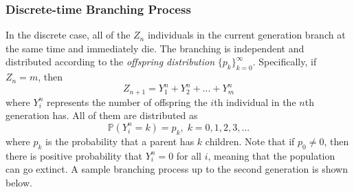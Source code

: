   \subsubsection{Discrete-time Branching Process}

    In the discrete case, all of the $Z_n$ individuals in the current generation branch at the same time and immediately die. The branching is independent and distributed according to the \textit{offspring distribution} $\{p_k\}_{k=0}^\infty$. Specifically, if $Z_n = m$, then 
    \begin{equation}
      Z_{n+1} = Y_1^n + Y_2^n + ... + Y_m^n
    \end{equation}
    where $Y_i^n$ represents the number of offspring the $i$th individual in the $n$th generation has. All of them are distributed as
    \begin{equation}
      \mathbb{P}(Y_i^n = k) = p_k, \; k = 0, 1, 2, 3, ...
    \end{equation}
    where $p_k$ is the probability that a parent has $k$ children. Note that if $p_0 \neq 0$, then there is positive probability that $Y_i^n = 0$ for all $i$, meaning that the population can go extinct. A sample branching process up to the second generation is shown below. 

    \begin{center}
    \end{center}


